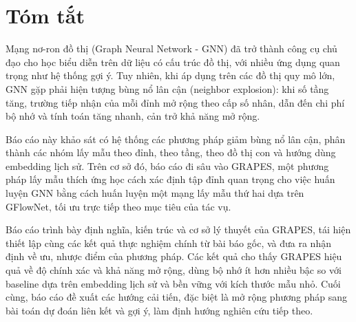 \chapter*{Tóm tắt}

Mạng nơ-ron đồ thị (Graph Neural Network - GNN) đã trở thành công cụ chủ đạo cho học biểu diễn trên dữ liệu có cấu trúc đồ thị, với nhiều ứng dụng quan trọng như hệ thống gợi ý. Tuy nhiên, khi áp dụng trên các đồ thị quy mô lớn, GNN gặp phải hiện tượng bùng nổ lân cận (neighbor explosion): khi số tầng tăng, trường tiếp nhận của mỗi đỉnh mở rộng theo cấp số nhân, dẫn đến chi phí bộ nhớ và tính toán tăng nhanh, cản trở khả năng mở rộng.

Báo cáo này khảo sát có hệ thống các phương pháp giảm bùng nổ lân cận, phân thành các nhóm lấy mẫu theo đỉnh, theo tầng, theo đồ thị con và hướng dùng embedding lịch sử. Trên cơ sở đó, báo cáo đi sâu vào GRAPES, một phương pháp lấy mẫu thích ứng học cách xác định tập đỉnh quan trọng cho việc huấn luyện GNN bằng cách huấn luyện một mạng lấy mẫu thứ hai dựa trên GFlowNet, tối ưu trực tiếp theo mục tiêu của tác vụ.

Báo cáo trình bày định nghĩa, kiến trúc và cơ sở lý thuyết của GRAPES, tái hiện thiết lập cùng các kết quả thực nghiệm chính từ bài báo gốc, và đưa ra nhận định về ưu, nhược điểm của phương pháp. Các kết quả cho thấy GRAPES hiệu quả về độ chính xác và khả năng mở rộng, dùng bộ nhớ ít hơn nhiều bậc so với baseline dựa trên embedding lịch sử và bền vững với kích thước mẫu nhỏ. Cuối cùng, báo cáo đề xuất các hướng cải tiến, đặc biệt là mở rộng phương pháp sang bài toán dự đoán liên kết và gợi ý, làm định hướng nghiên cứu tiếp theo.
